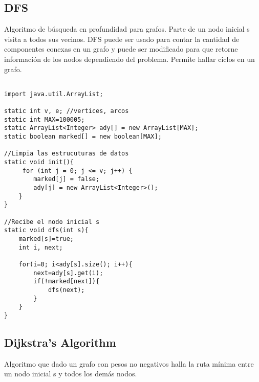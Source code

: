 \documentclass[11pt,letterpaper,twocolumn,twosided]{article}
\begin{document}
\subsection{DFS}
Algoritmo de b\'usqueda en profundidad para grafos. Parte de un nodo inicial s visita a todos sus vecinos. DFS puede ser usado para contar la cantidad de componentes conexas en un grafo y puede ser modificado para que retorne informaci\'on de los nodos dependiendo del problema. Permite hallar ciclos en un grafo.

\begin{lstlisting}

import java.util.ArrayList;

static int v, e; //vertices, arcos
static int MAX=100005; 
static ArrayList<Integer> ady[] = new ArrayList[MAX];
static boolean marked[] = new boolean[MAX];

//Limpia las estrucuturas de datos
static void init(){
	 for (int j = 0; j <= v; j++) {
        marked[j] = false;
        ady[j] = new ArrayList<Integer>();
    }
}

//Recibe el nodo inicial s
static void dfs(int s){
	marked[s]=true;
	int i, next;

	for(i=0; i<ady[s].size(); i++){
		next=ady[s].get(i);
		if(!marked[next]){
			dfs(next);
		}
	}
}
\end{lstlisting}

\subsection{Dijkstra's Algorithm}
Algoritmo que dado un grafo con pesos no negativos halla la ruta m\'inima entre un nodo inicial s y todos los dem\'as nodos.
\end{document}
